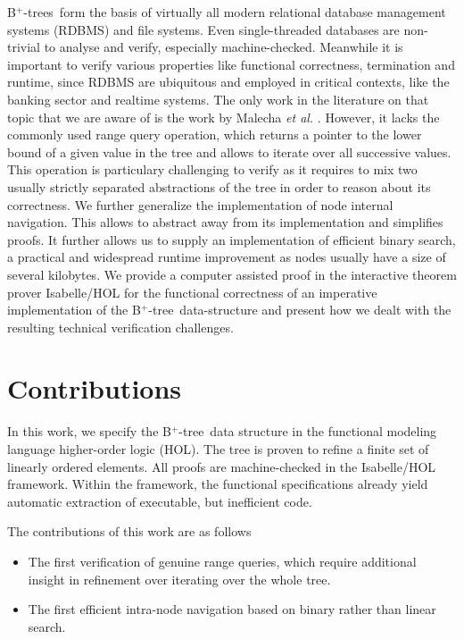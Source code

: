 \documentclass[runningheads]{llncs}
\newcommand{\btree}{B$^+$-tree}
\newcommand{\btrees}{B$^+$-trees}
\begin{document}
\btrees\ form the basis of virtually all modern relational database management systems (RDBMS)
and file systems.
Even single-threaded databases are non-trivial to analyse and verify,
especially machine-checked.
Meanwhile it is important to verify various properties like functional correctness,
termination and runtime,
since RDBMS are ubiquitous and employed in critical contexts,
like the banking sector and realtime systems.
The only work in the literature on that topic that we are aware of
is the work by Malecha \emph{et al.} \cite{DBLP:conf/popl/MalechaMSW10}.
However, it lacks the commonly used range
query operation, which returns a pointer to the lower bound of a given value
in the tree
and allows to iterate over all successive values.
This operation is particulary challenging to verify as it requires
to mix two usually strictly separated abstractions of the tree
in order to reason about its correctness.
We further generalize the implementation of node internal
navigation.
This allows to abstract away from its implementation
and simplifies proofs.
It further allows us to supply an implementation of
efficient binary search, a practical and widespread runtime improvement
as nodes usually have a size of several kilobytes.
We provide a computer assisted proof in the interactive
theorem prover Isabelle/HOL \cite{DBLP:books/sp/NipkowK14} for the functional
correctness of an imperative implementation of the \btree\ data-structure
and present how we dealt with the resulting technical verification challenges.



\section{Contributions}
\label{sec:contributions}

In this work, we specify the \btree\ data structure in the
functional modeling language higher-order logic (HOL).
The tree is proven to refine a finite set of linearly ordered elements.
All proofs are machine-checked in the Isabelle/HOL framework.
Within the framework,
the functional specifications already yield automatic extraction of executable,
but inefficient code.

 The contributions of this work are as follows
\begin{itemize}
   \item The first verification of genuine range queries,
         which require additional insight in refinement over iterating over the whole tree.
   \item The first efficient intra-node navigation based on binary rather than linear search.
\end{itemize}
\end{document}
